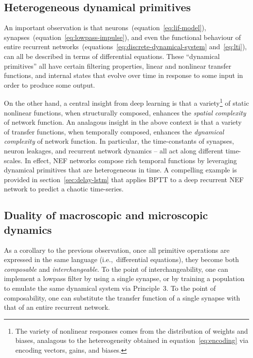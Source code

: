 \subsection{Heterogeneous dynamical primitives}

An important observation is that neurons~(equation~\ref{eq:lif-model}), synapses~(equation~\ref{eq:lowpass-impulse}), and even the functional behaviour of entire recurrent networks~(equations~\ref{eq:discrete-dynamical-system} and~\ref{eq:lti}), can all be described in terms of differential equations.
These ``dynamical primitives'' all have certain filtering properties, linear and nonlinear transfer functions, and internal states that evolve over time in response to some input in order to produce some output.

On the other hand, a central insight from deep learning is that a variety\footnote{
The variety of nonlinear responses comes from the distribution of weights and biases, analagous to the hetereogeneity obtained in equation~\ref{eq:encoding} via encoding vectors, gains, and biases.}
of static nonlinear functions, when structurally composed, enhances the \emph{spatial complexity} of network function.
An analagous insight in the above context is that a variety of transfer functions, when temporally composed, enhances the \emph{dynamical complexity} of network function.
In particular, the time-constants of synapses, neuron leakages, and recurrent network dynamics -- all act along different time-scales.
In effect, NEF networks compose rich temporal functions by leveraging dynamical primitives that are heterogeneous in time.
A compelling example is provided in section~\ref{sec:delay-lstm} that applies BPTT to a deep recurrent NEF network to predict a chaotic time-series.

\subsection{Duality of macroscopic and microscopic dynamics}

As a corollary to the previous observation,
once all primitive operations are expressed in the same language (i.e.,~differential equations), they become both \emph{composable} and \emph{interchangeable}.
To the point of interchangeability, one can implement a lowpass filter by using a single synapse, or by training a population to emulate the same dynamical system via Principle~3.
To the point of composability, one can substitute the transfer function of a single synapse with that of an entire recurrent network.

